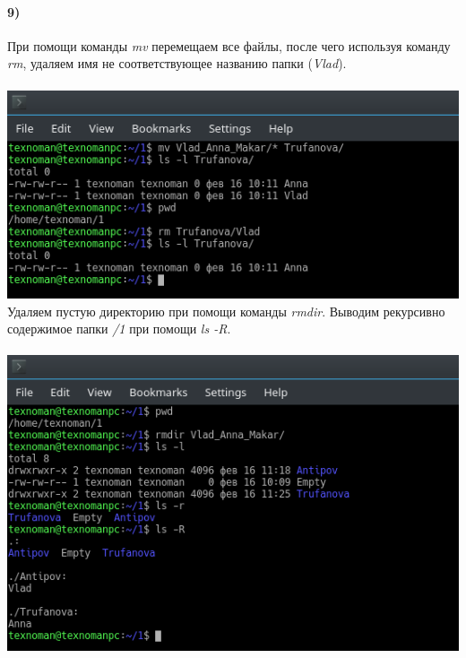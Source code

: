 	\paragraph{9)}
	При помощи команды \textit{mv} перемещаем все файлы, после чего используя команду \textit{rm}, удаляем имя не соответствующее названию папки (\textit{Vlad}).\\
	\\
	\includegraphics[width=\textwidth]{9.png}
	\\

	Удаляем пустую директорию при помощи команды \textit{rmdir}. Выводим рекурсивно содержимое папки \textit{/1} при помощи 
	\textit{ls -R}.\\
	\\
	\includegraphics[width=\textwidth]{10.png}
	\\
	\\

